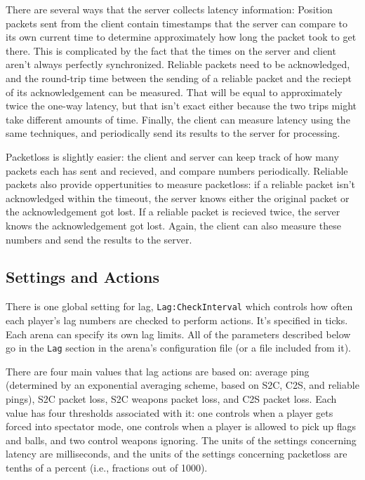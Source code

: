 \documentclass{article}
\begin{document}
There are several ways that the server collects latency information:
Position packets sent from the client contain timestamps that the server
can compare to its own current time to determine approximately how long
the packet took to get there. This is complicated by the fact that the
times on the server and client aren't always perfectly synchronized.
Reliable packets need to be acknowledged, and the round-trip time
between the sending of a reliable packet and the reciept of its
acknowledgement can be measured. That will be equal to approximately
twice the one-way latency, but that isn't exact either because the two
trips might take different amounts of time. Finally, the client can
measure latency using the same techniques, and periodically send its
results to the server for processing.

Packetloss is slightly easier: the client and server can keep track of
how many packets each has sent and recieved, and compare numbers
periodically. Reliable packets also provide oppertunities to measure
packetloss: if a reliable packet isn't acknowledged within the timeout,
the server knows either the original packet or the acknowledgement got
lost. If a reliable packet is recieved twice, the server knows the
acknowledgement got lost. Again, the client can also measure these
numbers and send the results to the server.

\subsection{Settings and Actions}

There is one global setting for lag, \texttt{Lag:CheckInterval} which
controls how often each player's lag numbers are checked to perform
actions. It's specified in ticks. Each arena can specify its own lag
limits. All of the parameters described below go in the \texttt{Lag}
section in the arena's configuration file (or a file included from it).

There are four main values that lag actions are based on: average ping
(determined by an exponential averaging scheme, based on S2C, C2S, and
reliable pings), S2C packet loss, S2C weapons packet loss, and C2S
packet loss. Each value has four thresholds associated with it: one
controls when a player gets forced into spectator mode, one controls
when a player is allowed to pick up flags and balls, and two control
weapons ignoring. The units of the settings concerning latency are
milliseconds, and the units of the settings concerning packetloss are
tenths of a percent (i.e., fractions out of 1000).
\end{document}

